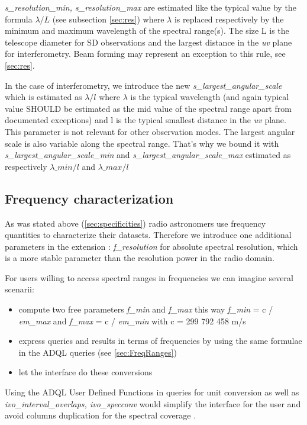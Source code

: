\documentclass[11pt,a4paper]{ivoa}
\begin{document}
\emph{s\_resolution\_min, s\_resolution\_max} are estimated like the typical value by the formula  $\lambda / L$  (see subsection \ref{sec:res}) where $\lambda$ is replaced respectively by the minimum and maximum wavelength of the spectral range(s). The size L is the telescope diameter for SD observations and the largest distance in the \emph{uv} plane for interferometry. Beam forming may represent an exception to this rule, see \ref{sec:res}.

In the case of interferometry, we introduce the new \emph{s\_largest\_angular\_scale} which is estimated as $\lambda/l$ where $\lambda$ is the typical
wavelength (and again typical value SHOULD be estimated as the mid value of the spectral range apart from documented exceptions) and l is the typical smallest distance in the \emph{uv} plane. This parameter is not relevant for other observation modes.
The largest angular scale is also variable along the spectral range. That's why we bound it with \emph{s\_largest\_angular\_scale\_min} and \emph{s\_largest\_angular\_scale\_max} estimated as  respectively $\lambda\_min/l$ and  $\lambda\_max/l$

\subsection{Frequency characterization}

As was stated above (\ref{sec:specificities}) radio astronomers use frequency quantities to characterize their datasets. Therefore we introduce one additional parameters in the extension : 
\emph{f\_resolution} for absolute spectral resolution, which is a more stable parameter than the resolution power in the radio domain.

For users willing to access spectral ranges in frequencies we can imagine several scenarii:
\begin{itemize}
	\item compute two free parameters \emph{f\_min} and \emph{f\_max} this way \emph{f\_min} = c / \emph{em\_max} and \emph{f\_max} = c / \emph{em\_min} with c = 299 792 458 m/s
	\item express queries and results in terms of frequencies by using the same  formulae in the ADQL queries (see \ref{sec:FreqRanges})
	\item let the interface do these conversions 	
\end{itemize}

Using the ADQL User Defined Functions \citep{2024ivoa.spec.1107C} in queries for unit conversion as well as \emph{ivo\_interval\_overlaps, ivo\_specconv} would simplify the interface for the user and avoid  columns duplication for the spectral coverage . 
\end{document}
